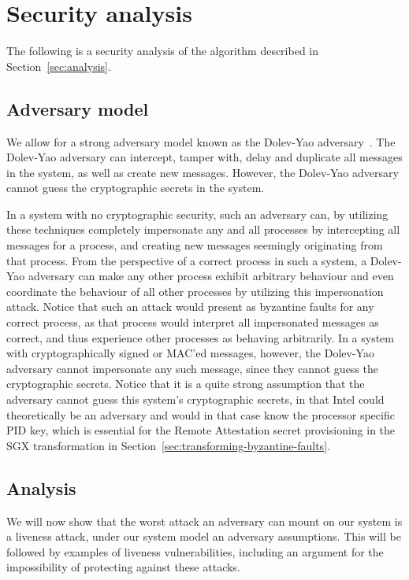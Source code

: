 \documentclass{article}
\begin{document}
	\section{Security analysis}
    \label{sec:security-analysis}

	The following is a security analysis of the algorithm described in Section~\ref{sec:analysis}.

		\subsection{Adversary model}

		We allow for a strong adversary model known as the Dolev-Yao adversary~\cite{dolev_security_1983}.
		The Dolev-Yao adversary can intercept, tamper with, delay and duplicate all messages in the system, as well as create new messages.
		However, the Dolev-Yao adversary cannot guess the cryptographic secrets in the system.

		In a system with no cryptographic security, such an adversary can, by utilizing these techniques completely impersonate any and all processes by intercepting all messages for a process, and creating new messages seemingly originating from that process.
		From the perspective of a correct process in such a system, a Dolev-Yao adversary can make any other process exhibit arbitrary behaviour and even coordinate the behaviour of all other processes by utilizing this impersonation attack.
		Notice that such an attack would present as byzantine faults for any correct process, as that process would interpret all impersonated messages as correct, and thus experience other processes as behaving arbitrarily.
		In a system with cryptographically signed or MAC'ed messages, however, the Dolev-Yao adversary cannot impersonate any such message, since they cannot guess the cryptographic secrets.
		Notice that it is a quite strong assumption that the adversary cannot guess this system's cryptographic secrets, in that Intel could theoretically be an adversary and would in that case know the processor specific PID key, which is essential for the Remote Attestation secret provisioning in the SGX transformation in Section~\ref{sec:transforming-byzantine-faults}.

		\subsection{Analysis}

        We will now show that the worst attack an adversary can mount on our system is a liveness attack, under our system model an adversary assumptions.
        This will be followed by examples of liveness vulnerabilities, including an argument for the impossibility of protecting against these attacks.
\end{document}
